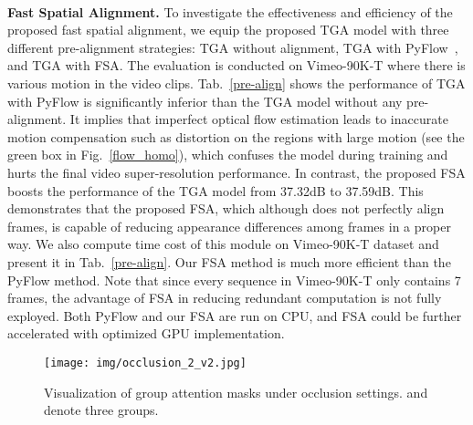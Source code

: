 ~~\\
\textbf{Fast Spatial Alignment.} To investigate the effectiveness and efficiency of the proposed fast spatial alignment, we equip the proposed TGA model with three different pre-alignment strategies: TGA without alignment, TGA with PyFlow~\cite{pathak2017learning}, and TGA with FSA. The evaluation is conducted on Vimeo-90K-T where there is various motion in the video clips.
Tab.~\ref{pre-align} shows the performance of TGA with PyFlow is significantly inferior than the TGA model without any pre-alignment. It implies that imperfect optical flow estimation leads to inaccurate motion compensation such as distortion on the regions with large motion (see the green box in Fig.~\ref{flow_homo}), which confuses the model during training and hurts the final video super-resolution performance. In contrast, the proposed FSA boosts the performance of the TGA model from 37.32dB to 37.59dB. This demonstrates that the proposed FSA, which although does not perfectly align frames, is capable of reducing appearance differences among frames in a proper way. We also compute time cost of this module on Vimeo-90K-T dataset and present it in Tab.~\ref{pre-align}. Our FSA method is much more efficient than the PyFlow method. Note that since every sequence in Vimeo-90K-T only contains 7 frames, the advantage of FSA in reducing redundant computation is not fully exployed. Both PyFlow and our FSA are run on CPU, and FSA could be further accelerated with optimized GPU implementation.\\ 
\begin{table}[t]
	\centering
     \vspace{1mm}
	\caption{Ablation on: the effectiveness and efficiency of the fast spatial alignment module. The elapsed time are calculated on processing a seven frame sequence with LR size of 11264.}
  \vspace{-1mm}
	\label{pre-align}
\end{table}

 \begin{figure}[t]
 	\centering
 	\texttt{[image: img/occlusion\_2\_v2.jpg]}
 	\caption{Visualization of group attention masks under occlusion settings.  and  denote three groups. 
 	}
  	\vspace{-5mm}
 	\label{occlusion}
 \end{figure} 
















%
